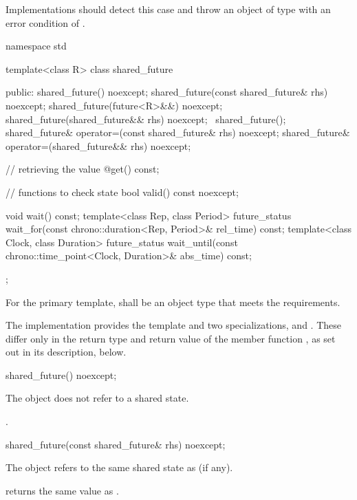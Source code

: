 \recommended
Implementations should detect this case and throw an object of type
 with an error condition of .

%
\begin{codeblock}
namespace std {
  template<class R>
  class shared_future {
  public:
    shared_future() noexcept;
    shared_future(const shared_future& rhs) noexcept;
    shared_future(future<R>&&) noexcept;
    shared_future(shared_future&& rhs) noexcept;
    ~shared_future();
    shared_future& operator=(const shared_future& rhs) noexcept;
    shared_future& operator=(shared_future&& rhs) noexcept;

    // retrieving the value
    @\seebelow@ get() const;

    // functions to check state
    bool valid() const noexcept;

    void wait() const;
    template<class Rep, class Period>
      future_status wait_for(const chrono::duration<Rep, Period>& rel_time) const;
    template<class Clock, class Duration>
      future_status wait_until(const chrono::time_point<Clock, Duration>& abs_time) const;
  };
}
\end{codeblock}

\pnum
For the primary template,  shall be an object type that
meets the  requirements.

\pnum
The implementation provides the template  and two
specializations,  and . These
differ only in the return type and return value of the member function , as
set out in its description, below.

%
\begin{itemdecl}
shared_future() noexcept;
\end{itemdecl}

\begin{itemdescr}
\pnum
\effects
The object does not refer to a shared state.

\pnum
\ensures
{}.
\end{itemdescr}

%
\begin{itemdecl}
shared_future(const shared_future& rhs) noexcept;
\end{itemdecl}

\begin{itemdescr}
\pnum
\effects
The object refers to the same
shared state as  (if any).

\pnum
\ensures
{} returns the same value as .
\end{itemdescr}

